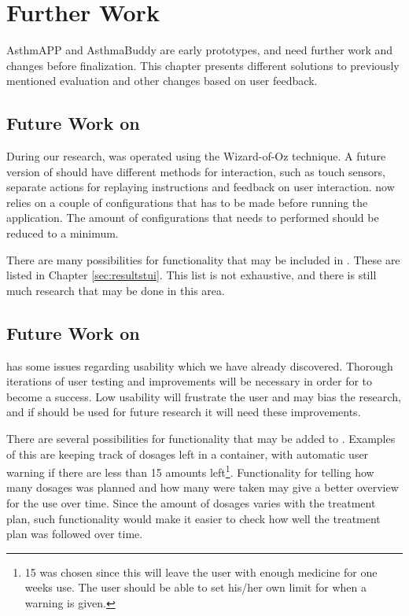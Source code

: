 \chapter{Further Work}
\label{chp:futurework}

AsthmAPP and AsthmaBuddy are early prototypes, and need further work and changes before finalization. This chapter presents different solutions to previously mentioned evaluation and other changes based on user feedback.

\section{Future Work on \ab{}}
\label{sec:futureworkab}
During our research, \ab{} was operated using the Wizard-of-Oz technique. A future version of \ab{} should have different methods for interaction, such as touch sensors, separate actions for replaying instructions and feedback on user interaction. \ab{} now relies on a couple of configurations that has to be made before running the application. The amount of configurations that needs to performed should be reduced to a minimum.  

There are many possibilities for functionality that may be included in \ab{}. These are listed in Chapter \ref{sec:resultstui}. This list is not exhaustive, and there is still much research that may be done in this area.


\section{Future Work on \app{}}
\label{sec:futureworkapp}
\app{} has some issues regarding usability which we have already discovered. Thorough iterations of user testing and improvements will be necessary in order for \app{} to become a success. Low usability will frustrate the user and may bias the research, and if \app{} should be used for future research it will need these improvements. 

There are several possibilities for functionality that may be added to \app{}. Examples of this are keeping track of dosages left in a container, with automatic user warning if there are less than 15 amounts left\footnote{15 was chosen since this will leave the user with enough medicine for one weeks use. The user should be able to set his/her own limit for when a warning is given.}. Functionality for telling how many dosages was planned and how many were taken may give a better overview for the use over time. Since the amount of dosages varies with the treatment plan, such functionality would make it easier to check how well the treatment plan was followed over time. 

